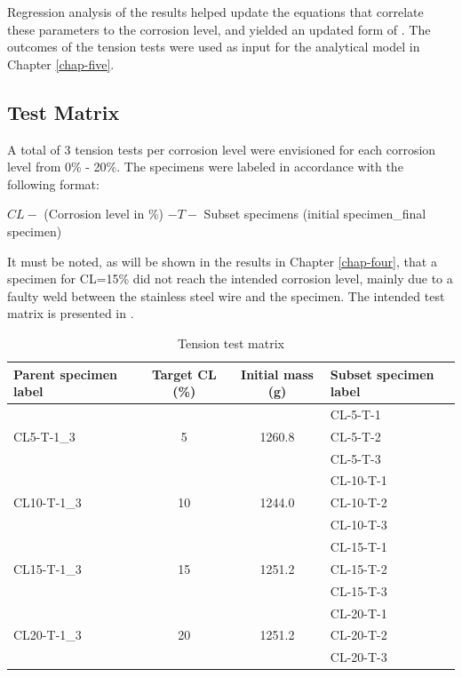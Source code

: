 Regression analysis of the results helped update the equations that correlate these parameters to the corrosion level, and yielded an updated form of . The outcomes of the tension tests were used as input for the analytical model in Chapter \ref{chap-five}.

\subsection{Test Matrix}

A total of 3 tension tests per corrosion level were envisioned for each corrosion level from 0\% - 20\%. The specimens were labeled in accordance with the following format:

$CL-$ (Corrosion level in  \%) $-T-$ Subset specimens (initial specimen\_final specimen)

It must be noted, as will be shown in the results in Chapter \ref{chap-four}, that a specimen for CL=15\% did not reach the intended corrosion level, mainly due to a faulty weld between the stainless steel wire and the specimen. The intended test matrix is presented in .

\begin{table}[htbp]
\caption{Tension test matrix}
\label{tab:tension_matrix}
\centering
\begin{tabular}{lccl}
Parent specimen label        & Target CL (\%)      & Initial mass (g)        & Subset specimen label \\ \hline
\multirow{3}{*}{CL5-T-1\_3}  & \multirow{3}{*}{5}  & \multirow{3}{*}{1260.8} & CL-5-T-1              \\
                             &                     &                         & CL-5-T-2              \\
                             &                     &                         & CL-5-T-3              \\
\multirow{3}{*}{CL10-T-1\_3} & \multirow{3}{*}{10} & \multirow{3}{*}{1244.0} & CL-10-T-1             \\
                             &                     &                         & CL-10-T-2             \\
                             &                     &                         & CL-10-T-3             \\
\multirow{3}{*}{CL15-T-1\_3\*} & \multirow{3}{*}{15} & \multirow{3}{*}{1251.2} & CL-15-T-1             \\
                             &                     &                         & CL-15-T-2             \\
                             &                     &                         & CL-15-T-3             \\
\multirow{3}{*}{CL20-T-1\_3} & \multirow{3}{*}{20} & \multirow{3}{*}{1251.2} & CL-20-T-1             \\
                             &                     &                         & CL-20-T-2             \\
                             &                     &                         & CL-20-T-3            
\end{tabular}
\end{table}

